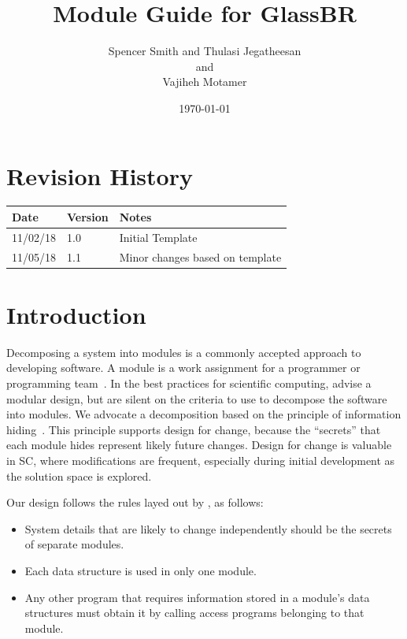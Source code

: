 \documentclass[12pt]{article}
\newcommand{\progname}{GlassBR}
\begin{document}
\title{Module Guide for \progname} 
\author{Spencer Smith and Thulasi Jegatheesan \\and\\ Vajiheh Motamer}
\date{\today}
	
\maketitle


\newpage

\section{Revision History}

\begin{tabularx}{\textwidth}{p{3cm}p{2cm}X}
	\toprule {\bf Date} & {\bf Version} & {\bf Notes}\\
	\midrule
	11/02/18 & 1.0 & Initial Template\\
	11/05/18 & 1.1 & Minor changes based on template\\
	\bottomrule
\end{tabularx}

\newpage

\tableofcontents

\listoftables

\listoffigures

\newpage


\section{Introduction}

Decomposing a system into modules is a commonly accepted approach to developing
software.  A module is a work assignment for a programmer or programming
team~\citep{ParnasEtAl1984}.  In the best practices for scientific computing,
\citet{WilsonEtAl2013} advise a modular design, but are silent on the criteria
to use to decompose the software into modules.  We advocate a decomposition
based on the principle of information hiding~\citep{Parnas1972a}.  This
principle supports design for change, because the ``secrets'' that each module
hides represent likely future changes.  Design for change is valuable in SC,
where modifications are frequent, especially during initial development as the
solution space is explored.  

Our design follows the rules layed out by \citet{ParnasEtAl1984}, as follows:
\begin{itemize}
\item System details that are likely to change independently should be the
  secrets of separate modules.
\item Each data structure is used in only one module.
\item Any other program that requires information stored in a module's data
  structures must obtain it by calling access programs belonging to that module.
\end{itemize}
\end{document}
